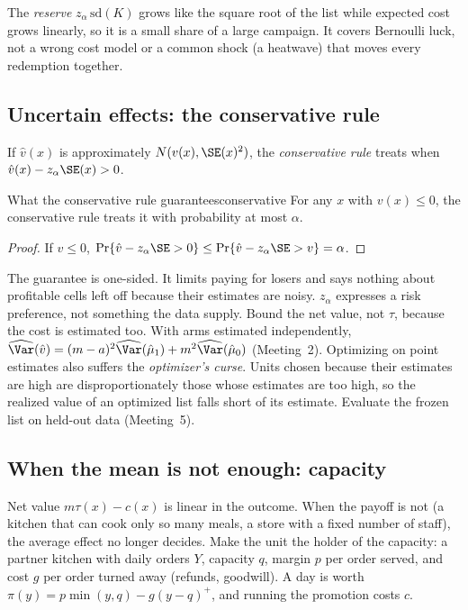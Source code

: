 \documentclass[11pt]{article}
\begin{document}
The \emph{reserve} $z_\alpha\,\text{sd}(K)$ grows like the square root of the list while expected cost grows linearly, so it is a
small share of a large campaign. It covers Bernoulli luck, not a wrong cost model or a common shock (a heatwave) that moves
every redemption together.

\subsection{Uncertain effects: the conservative rule}

If $\hat v(x)$ is approximately $N(v(x), \SE(x)^2)$, the \emph{conservative rule} treats when
$\hat v(x) - z_\alpha\SE(x) > 0$.

\begin{prop}{What the conservative rule guarantees}{conservative}
For any $x$ with $v(x) \le 0$, the conservative rule treats it with probability at most $\alpha$.
\end{prop}
\begin{proof}
If $v \le 0$, $\Pr\{\hat v - z_\alpha\SE > 0\} \le \Pr\{\hat v - z_\alpha\SE > v\} = \alpha$.
\end{proof}

The guarantee is one-sided. It limits paying for losers and says nothing about profitable cells left off because
their estimates are noisy. $z_\alpha$ expresses a risk preference, not something the data supply. Bound the net value, not
$\tau$, because the cost is estimated too. With arms estimated independently, $\widehat\Var(\hat v) = (m - a)^2\widehat\Var(\hat\mu_1) + m^2\widehat\Var(\hat\mu_0)$ (Meeting~2). Optimizing
on point estimates also suffers the \emph{optimizer's curse}. Units chosen because their estimates are high are
disproportionately those whose estimates are too high, so the realized value of an optimized list falls short of its
estimate. Evaluate the frozen list on held-out data (Meeting~5).

\subsection{When the mean is not enough: capacity}

Net value $m\tau(x) - c(x)$ is linear in the outcome. When the payoff is not (a kitchen that can cook only so many meals,
a store with a fixed number of staff), the average effect no longer decides. Make the unit the holder of the capacity: a
partner kitchen with daily orders $Y$, capacity $q$, margin $p$ per order served, and cost $g$ per order turned away
(refunds, goodwill). A day is worth $\pi(y) = p\min(y, q) - g(y - q)^+$, and running the promotion costs $c$.
\end{document}
